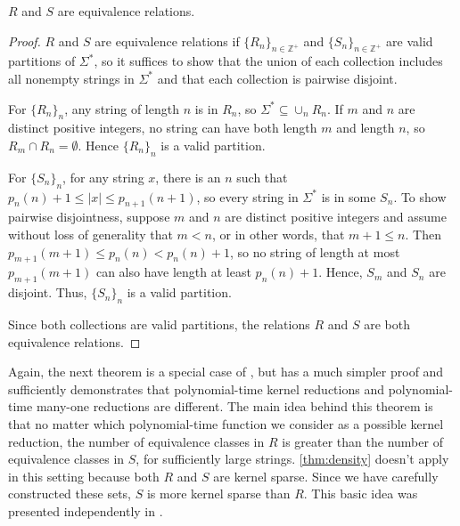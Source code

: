 \begin{lemma}
  $R$ and $S$ are equivalence relations.
\end{lemma}
\begin{proof}
  $R$ and $S$ are equivalence relations if $\{R_n\}_{n \in \mathbb{Z}^+}$ and $\{S_n\}_{n \in \mathbb{Z}^+}$ are valid partitions of $\Sigma^*$, so it suffices to show that the union of each collection includes all nonempty strings in $\Sigma^*$ and that each collection is pairwise disjoint.

  For $\{R_n\}_n$, any string of length $n$ is in $R_n$, so $\Sigma^* \subseteq \cup_n R_n$.
  If $m$ and $n$ are distinct positive integers, no string can have both length $m$ and length $n$, so $R_m \cap R_n = \emptyset$.
  Hence $\{R_n\}_n$ is a valid partition.

  For $\{S_n\}_n$, for any string $x$, there is an $n$ such that $p_n(n) + 1 \leq |x| \leq p_{n + 1}(n + 1)$, so every string in $\Sigma^*$ is in some $S_n$.
  To show pairwise disjointness, suppose $m$ and $n$ are distinct positive integers and assume without loss of generality that $m < n$, or in other words, that $m + 1 \leq n$.
  Then $p_{m + 1}(m + 1) \leq p_n(n) < p_n(n) + 1$, so no string of length at most $p_{m + 1}(m + 1)$ can also have length at least $p_n(n) + 1$.
  Hence, $S_m$ and $S_n$ are disjoint.
  Thus, $\{S_n\}_n$ is a valid partition.

  Since both collections are valid partitions, the relations $R$ and $S$ are both equivalence relations.
\end{proof}

Again, the next theorem is a special case of \autocite[Theorem~5.1]{bcffm}, but has a much simpler proof and sufficiently demonstrates that polynomial-time kernel reductions and polynomial-time many-one reductions are different.
The main idea behind this theorem is that no matter which polynomial-time function we consider as a possible kernel reduction, the number of equivalence classes in $R$ is greater than the number of equivalence classes in $S$, for sufficiently large strings.
\autoref{thm:density} doesn't apply in this setting because both $R$ and $S$ are kernel sparse.
Since we have carefully constructed these sets, $S$ is more kernel sparse than $R$.
This basic idea was presented independently in \autocite[Lemma~2.3]{gz14}.

